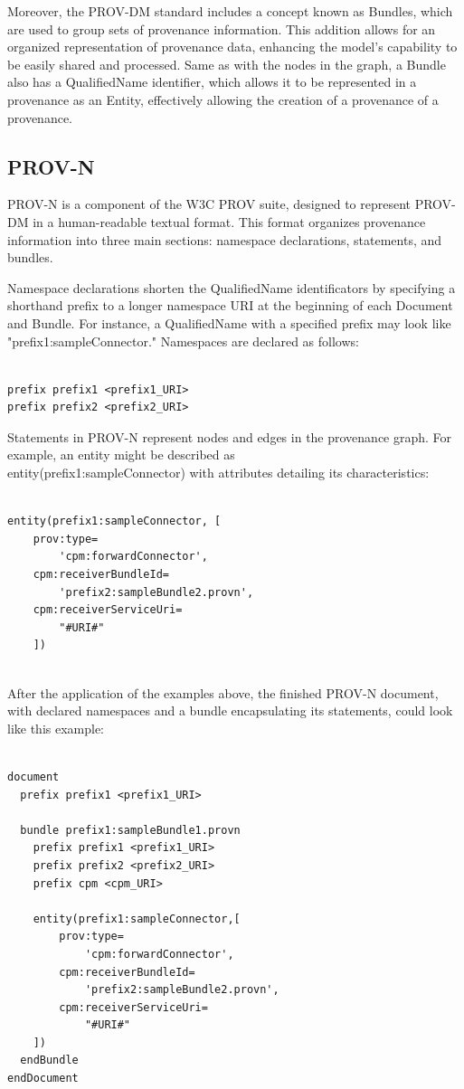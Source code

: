\documentclass[
  digital,     %
  oneside,     %
  nosansbold,  %
  nocolorbold, %
  lof,         %
  lot,         %
]{fithesis4}
\begin{document}
Moreover, the PROV-DM standard includes a concept known as Bundles, which are used to group sets of provenance information. This addition allows for an organized representation of provenance data, enhancing the model's capability to be easily shared and processed. Same as with the nodes in the graph, a Bundle also has a QualifiedName identifier, which allows it to be represented in a provenance as an Entity, effectively allowing the creation of a provenance of a provenance.
\shorthandon{-}

\subsection{PROV-N}
\shorthandoff{-}
PROV-N is a component of the W3C PROV suite, designed to represent PROV-DM in a human-readable textual format. This format organizes provenance information into three main sections: namespace declarations, statements, and bundles. 

Namespace declarations shorten the QualifiedName identificators by specifying a shorthand prefix to a longer namespace URI at the beginning of each Document and Bundle. For instance, a QualifiedName with a specified prefix may look like "prefix1:sampleConnector." Namespaces are declared as follows:

\begin{verbatim}

prefix prefix1 <prefix1_URI>
prefix prefix2 <prefix2_URI>

\end{verbatim}

Statements in PROV-N represent nodes and edges in the provenance graph. For example, an entity might be described as \\entity(prefix1:sampleConnector) with attributes detailing its characteristics:

\begin{verbatim}

entity(prefix1:sampleConnector, [
    prov:type=
        'cpm:forwardConnector', 
    cpm:receiverBundleId=
        'prefix2:sampleBundle2.provn', 
    cpm:receiverServiceUri=
        "#URI#"
    ])
    
\end{verbatim}

After the application of the examples above, the finished PROV-N document, with declared namespaces and a bundle encapsulating its statements, could look like this example:

\begin{verbatim}

document
  prefix prefix1 <prefix1_URI>

  bundle prefix1:sampleBundle1.provn
    prefix prefix1 <prefix1_URI>
    prefix prefix2 <prefix2_URI>
    prefix cpm <cpm_URI>

    entity(prefix1:sampleConnector,[
        prov:type=
            'cpm:forwardConnector',
        cpm:receiverBundleId=
            'prefix2:sampleBundle2.provn',
        cpm:receiverServiceUri=
            "#URI#"
    ])
  endBundle
endDocument

\end{verbatim}
\shorthandon{-}
\end{document}
